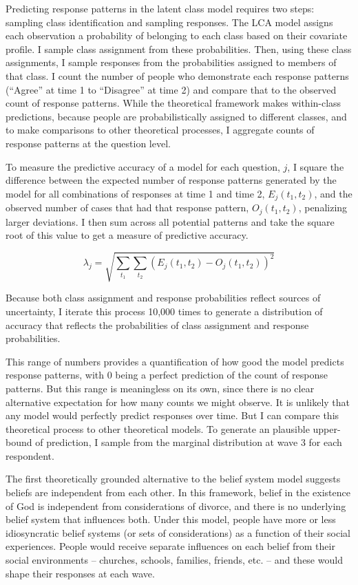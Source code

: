 \documentclass[12pt,]{article}
\begin{document}
Predicting response patterns in the latent class model requires two steps: sampling class identification and sampling responses. The LCA model assigns each observation a probability of belonging to each class based on their covariate profile. I sample class assignment from these probabilities. Then, using these class assignments, I sample responses from the probabilities assigned to members of that class. I count the number of people who demonstrate each response patterns (``Agree'' at time 1 to ``Disagree'' at time 2) and compare that to the observed count of response patterns. While the theoretical framework makes within-class predictions, because people are probabilistically assigned to different classes, and to make comparisons to other theoretical processes, I aggregate counts of response patterns at the question level.

To measure the predictive accuracy of a model for each question, \(j\), I square the difference between the expected number of response patterns generated by the model for all combinations of responses at time 1 and time 2, \(E_{j}(t_1, t_2)\), and the observed number of cases that had that response pattern, \(O_{j}(t_1, t_2)\), penalizing larger deviations. I then sum across all potential patterns and take the square root of this value to get a measure of predictive accuracy.

\[ \lambda_j =  \sqrt{\sum_{t_1}\sum_{t_2}(E_j(t_1, t_2) - O_j(t_1, t_2))^2} \]

Because both class assignment and response probabilities reflect sources of uncertainty, I iterate this process 10,000 times to generate a distribution of accuracy that reflects the probabilities of class assignment and response probabilities.

This range of numbers provides a quantification of how good the model predicts response patterns, with 0 being a perfect prediction of the count of response patterns. But this range is meaningless on its own, since there is no clear alternative expectation for how many counts we might observe. It is unlikely that any model would perfectly predict responses over time. But I can compare this theoretical process to other theoretical models. To generate an plausible upper-bound of prediction, I sample from the marginal distribution at wave 3 for each respondent.

The first theoretically grounded alternative to the belief system model suggests beliefs are independent from each other. In this framework, belief in the existence of God is independent from considerations of divorce, and there is no underlying belief system that influences both. Under this model, people have more or less idiosyncratic belief systems (or sets of considerations) as a function of their social experiences. People would receive separate influences on each belief from their social environments -- churches, schools, families, friends, etc. -- and these would shape their responses at each wave.
\end{document}
